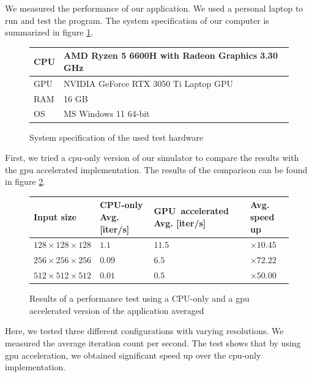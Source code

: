 We measured the performance of our application.
We used a personal laptop to run and test the program.
The system specification of our computer is summarized in figure \ref{fig:system_spec}.
\begin{figure}
	\begin{center}
		\begin{tabular}{|m{5em}||m{25em}|}
			\hline
			CPU & AMD Ryzen 5 6600H with Radeon Graphics            3.30 GHz\\
			\hline
			GPU & NVIDIA GeForce RTX 3050 Ti Laptop GPU\\		
			\hline
			RAM & 16 GB\\		
			\hline
			OS & MS Windows 11 64-bit\\		
			\hline
		\end{tabular}
		\caption{System specification of the used test hardware}
		\label{fig:system_spec}
	\end{center}
\end{figure}
First, we tried a \acrshort{cpu}-only version of our simulator to compare the results with the \acrshort{gpu} accelerated implementation.
The results of the comparison can be found in figure \ref{fig:performance_test}.
\begin{figure}
	\begin{center}
		\begin{tabular}{|m{8em}||m{8em}| m{8em}| m{4em}|}
			\hline
			Input size & CPU-only Avg. [iter/s] & GPU~accelerated Avg. [iter/s] & Avg. speed up\\
			\hline
			$128 \times 128 \times 128$ & $1.1$ & $11.5$ & $\times 10.45$\\
			\hline
			$256 \times 256 \times 256$ & $0.09$ & $6.5$ & $\times 72.22$\\
			\hline
			$512 \times 512 \times 512$ & $0.01$ & $0.5$ & $\times 50.00$\\
			\hline
		\end{tabular}
		\caption{Results of a performance test using a CPU-only and a \acrshort{gpu} accelerated version of the application averaged}
		\label{fig:performance_test}
	\end{center}
\end{figure}
Here, we tested three different configurations with varying resolutions.
We measured the average iteration count per second.
The test shows that by using \acrshort{gpu} acceleration, we obtained significant speed up over the \acrshort{cpu}-only implementation.






